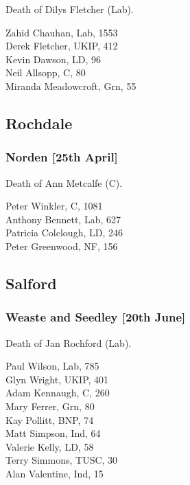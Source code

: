 \documentclass[a4paper,openany,10pt]{book}
\begin{document}

Death of Dilys Fletcher (Lab).



Zahid Chauhan, Lab, 1553\\
Derek Fletcher, UKIP, 412\\
Kevin Dawson, LD, 96\\
Neil Allsopp, C, 80\\
{Miranda Meadowcroft}, Grn, 55\\


\subsection*{Rochdale}

\subsubsection*{Norden \hspace*{\fill}\nolinebreak[1]%
\enspace\hspace*{\fill}
[25th April]}


Death of Ann Metcalfe (C).



Peter Winkler, C, 1081\\
Anthony Bennett, Lab, 627\\
Patricia Colclough, LD, 246\\
Peter Greenwood, NF, 156\\


\subsection*{Salford}

\subsubsection*{Weaste and Seedley \hspace*{\fill}\nolinebreak[1]%
\enspace\hspace*{\fill}
[20th June]}


Death of Jan Rochford (Lab).



Paul Wilson, Lab, 785\\
Glyn Wright, UKIP, 401\\
Adam Kennaugh, C, 260\\
Mary Ferrer, Grn, 80\\
Kay Pollitt, BNP, 74\\
Matt Simpson, Ind, 64\\
Valerie Kelly, LD, 58\\
Terry Simmons, TUSC, 30\\
Alan Valentine, Ind, 15\\
\end{document}

